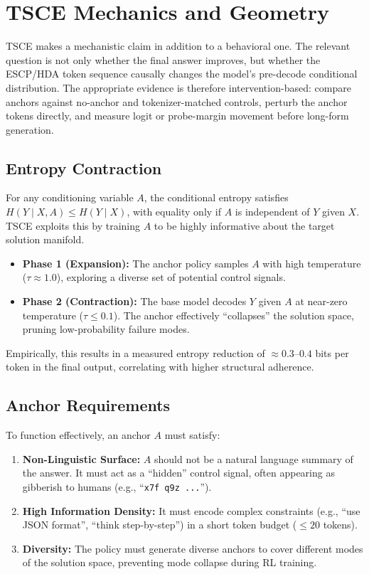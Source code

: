 \documentclass[11pt]{article}
\begin{document}
\section{TSCE Mechanics and Geometry}

TSCE makes a mechanistic claim in addition to a behavioral one. The relevant question is not only whether the final answer improves, but whether the ESCP/HDA token sequence causally changes the model's pre-decode conditional distribution. The appropriate evidence is therefore intervention-based: compare anchors against no-anchor and tokenizer-matched controls, perturb the anchor tokens directly, and measure logit or probe-margin movement before long-form generation.

\subsection{Entropy Contraction}
For any conditioning variable $A$, the conditional entropy satisfies $H(Y \mid X, A) \leq H(Y \mid X)$, with equality only if $A$ is independent of $Y$ given $X$. TSCE exploits this by training $A$ to be highly informative about the target solution manifold.
\begin{itemize}
    \item \textbf{Phase 1 (Expansion):} The anchor policy samples $A$ with high temperature ($\tau \approx 1.0$), exploring a diverse set of potential control signals.
    \item \textbf{Phase 2 (Contraction):} The base model decodes $Y$ given $A$ at near-zero temperature ($\tau \leq 0.1$). The anchor effectively ``collapses'' the solution space, pruning low-probability failure modes.
\end{itemize}
Empirically, this results in a measured entropy reduction of $\approx 0.3$--$0.4$ bits per token in the final output, correlating with higher structural adherence.

\subsection{Anchor Requirements}
To function effectively, an anchor $A$ must satisfy:
\begin{enumerate}
    \item \textbf{Non-Linguistic Surface:} $A$ should not be a natural language summary of the answer. It must act as a ``hidden'' control signal, often appearing as gibberish to humans (e.g., ``\texttt{x7f q9z ...}'').
    \item \textbf{High Information Density:} It must encode complex constraints (e.g., ``use JSON format'', ``think step-by-step'') in a short token budget ($\leq 20$ tokens).
    \item \textbf{Diversity:} The policy must generate diverse anchors to cover different modes of the solution space, preventing mode collapse during RL training.
\end{enumerate}
\end{document}
